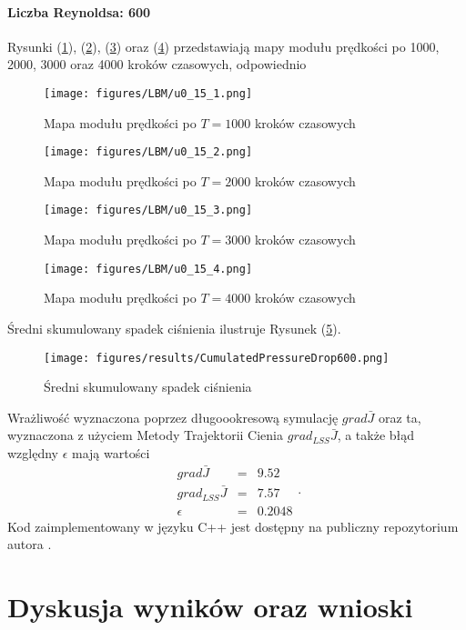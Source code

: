 \documentclass[12pt]{article}
\begin{document}
\paragraph{Liczba Reynoldsa: 600}
Rysunki (\ref{Fig51}), (\ref{Fig52}), (\ref{Fig53}) oraz (\ref{Fig54}) przedstawiają mapy modułu prędkości po 1000, 2000, 3000 oraz 4000 kroków czasowych, odpowiednio 
\begin{figure}[H]
	\texttt{[image: figures/LBM/u0\_15\_1.png]} 
	\caption{Mapa modułu prędkości po $ T=1000 $ kroków czasowych}
	\label{Fig51}
\end{figure}
\begin{figure}[H]
	\texttt{[image: figures/LBM/u0\_15\_2.png]} 
	\caption{Mapa modułu prędkości po $ T=2000 $ kroków czasowych}
	\label{Fig52}
\end{figure}
\begin{figure}[H]
	\texttt{[image: figures/LBM/u0\_15\_3.png]} 
	\caption{Mapa modułu prędkości po $ T=3000 $ kroków czasowych}
	\label{Fig53}
\end{figure}
\begin{figure}[H]
	\texttt{[image: figures/LBM/u0\_15\_4.png]} 
	\caption{Mapa modułu prędkości po $ T=4000 $ kroków czasowych}
	\label{Fig54}
\end{figure}
Średni skumulowany spadek ciśnienia ilustruje Rysunek (\ref{Fig55}).
\begin{figure}[H]
	\texttt{[image: figures/results/CumulatedPressureDrop600.png]} 
	\centering
	\caption{Średni skumulowany spadek ciśnienia}
	\label{Fig55}
\end{figure}
Wrażliwość wyznaczona poprzez długoookresową symulację $ grad\bar{J} $ oraz ta, wyznaczona z użyciem Metody Trajektorii Cienia $ grad_{LSS}\bar{J} $, a także błąd względny $ \epsilon $ mają wartości
\begin{equation}
\begin{array}{rcl}
grad\bar{J} &=& 9.52 \\
grad_{LSS}\bar{J} &=& 7.57 \\ 
\epsilon &=& 0.2048
\end{array}.
\label{result600}
\end{equation}
Kod zaimplementowany w języku C++ jest dostępny na publiczny repozytorium autora \cite{Marek2}.
\newpage
\section{Dyskusja wyników oraz wnioski}
\end{document}
